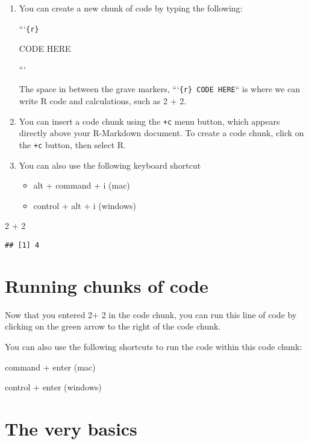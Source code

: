 \documentclass[
]{book}
\newenvironment{Shaded}{\begin{snugshade}}{\end{snugshade}}
\newcommand{\DecValTok}[1]{\textcolor[rgb]{0.00,0.00,0.81}{#1}}
\newcommand{\SpecialCharTok}[1]{\textcolor[rgb]{0.00,0.00,0.00}{#1}}
\begin{document}
\begin{enumerate}
\def\labelenumi{\arabic{enumi}.}
\item
  You can create a new chunk of code by typing the following:

  ```\texttt{\{r\}}

  CODE HERE

  ```

  The space in between the grave markers, ```\texttt{\{r\}\textasciigrave{}\ CODE\ HERE}`` is where we can write R code and calculations, such as 2 + 2.
\item
  You can insert a code chunk using the \texttt{+c} menu button, which appears directly above your R-Markdown document. To create a code chunk, click on the \texttt{+c} button, then select R.
\item
  You can also use the following keyboard shortcut

  \begin{itemize}
  \item
    alt + command + i (mac)
  \item
    control + alt + i (windows)
  \end{itemize}
\end{enumerate}

\begin{Shaded}
\begin{Highlighting}[]
\DecValTok{2} \SpecialCharTok{+} \DecValTok{2}
\end{Highlighting}
\end{Shaded}

\begin{verbatim}
## [1] 4
\end{verbatim}

\hypertarget{running-chunks-of-code}{%
\section{Running chunks of code}\label{running-chunks-of-code}}

Now that you entered 2+ 2 in the code chunk, you can run this line of code by clicking on the green arrow to the right of the code chunk.

You can also use the following shortcuts to run the code within this code chunk:

command + enter (mac)

control + enter (windows)

\hypertarget{the-very-basics}{%
\section{The very basics}\label{the-very-basics}}
\end{document}

